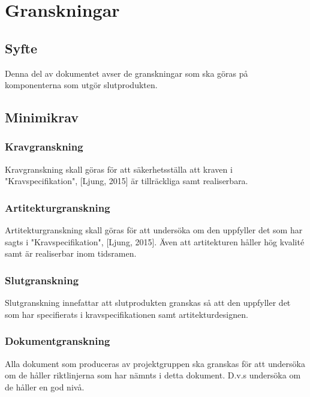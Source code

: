 \section{Granskningar}

\subsection{Syfte}
Denna del av dokumentet avser de granskningar som ska göras på komponenterna som utgör slutprodukten. 

\subsection{Minimikrav}

\subsubsection{Kravgranskning}
Kravgranskning skall göras för att säkerhetsställa att kraven i "Kravspecifikation", [Ljung, 2015] är tillräckliga samt realiserbara.

\subsubsection{Artitekturgranskning}
Artitekturgranskning skall göras för att undersöka om den uppfyller det som har sagts i "Kravspecifikation", [Ljung, 2015]. Även att artitekturen håller hög kvalité samt är realiserbar inom tidsramen. 

\subsubsection{Slutgranskning}
Slutgranskning innefattar att slutprodukten granskas så att den uppfyller det som har specifierats i kravspecifikationen samt artitekturdesignen. 

\subsubsection{Dokumentgranskning}
Alla dokument som produceras av projektgruppen ska granskas för att undersöka om de håller riktlinjerna som har nämnts i detta dokument. D.v.s undersöka om de håller en god nivå. 



